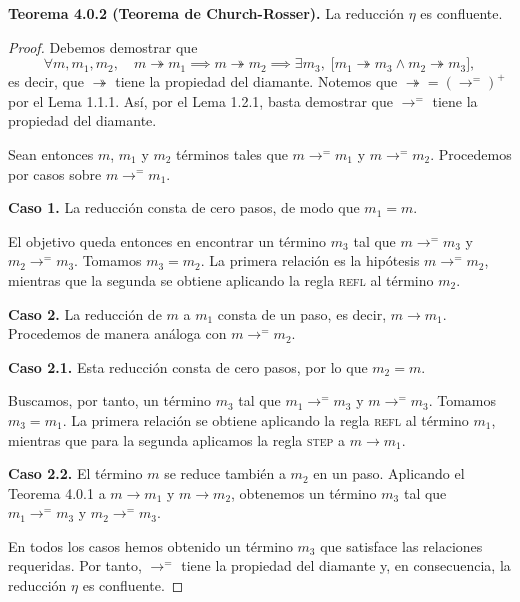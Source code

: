 \documentclass[
  spanish,
  letterpaper,
  DIV=11,
  numbers=noendperiod]{scrreprt}
\theoremstyle{remark}
\begin{document}
\textbf{Teorema 4.0.2 (Teorema de Church-Rosser).} La reducción \(\eta\)
es confluente.

\begin{proof}
Debemos demostrar que \[
\forall m,m_1,m_2,\quad
m\twoheadrightarrow m_1\implies
m\twoheadrightarrow m_2\implies
\exists m_3,\;
\bigl[
m_1\twoheadrightarrow m_3\land
m_2\twoheadrightarrow m_3
\bigr],
\] es decir, que \(\twoheadrightarrow\) tiene la propiedad del diamante.
Notemos que \(\twoheadrightarrow=(\longrightarrow^{=})^+\) por el Lema
1.1.1. Así, por el Lema 1.2.1, basta demostrar que
\(\longrightarrow^{=}\) tiene la propiedad del diamante.

Sean entonces \(m\), \(m_1\) y \(m_2\) términos tales que
\(m\longrightarrow^{=}m_1\) y \(m\longrightarrow^{=}m_2\). Procedemos
por casos sobre \(m\longrightarrow^{=}m_1\).

\textbf{Caso 1.} La reducción consta de cero pasos, de modo que
\(m_1=m\).

El objetivo queda entonces en encontrar un término \(m_3\) tal que
\(m\longrightarrow^{=}m_3\) y \(m_2\longrightarrow^{=}m_3\). Tomamos
\(m_3=m_2\). La primera relación es la hipótesis
\(m\longrightarrow^{=}m_2\), mientras que la segunda se obtiene
aplicando la regla \textsc{refl} al término \(m_2\).

\textbf{Caso 2.} La reducción de \(m\) a \(m_1\) consta de un paso, es
decir, \(m\longrightarrow m_1\). Procedemos de manera análoga con
\(m\longrightarrow^{=}m_2\).

\textbf{Caso 2.1.} Esta reducción consta de cero pasos, por lo que
\(m_2=m\).

Buscamos, por tanto, un término \(m_3\) tal que
\(m_1\longrightarrow^{=}m_3\) y \(m\longrightarrow^{=}m_3\). Tomamos
\(m_3=m_1\). La primera relación se obtiene aplicando la regla
\textsc{refl} al término \(m_1\), mientras que para la segunda aplicamos
la regla \textsc{step} a \(m\longrightarrow m_1\).

\textbf{Caso 2.2.} El término \(m\) se reduce también a \(m_2\) en un
paso. Aplicando el Teorema 4.0.1 a \(m\longrightarrow m_1\) y
\(m\longrightarrow m_2\), obtenemos un término \(m_3\) tal que
\(m_1\longrightarrow^{=}m_3\) y \(m_2\longrightarrow^{=}m_3\).

En todos los casos hemos obtenido un término \(m_3\) que satisface las
relaciones requeridas. Por tanto, \(\longrightarrow^{=}\) tiene la
propiedad del diamante y, en consecuencia, la reducción \(\eta\) es
confluente.
\end{proof}
\end{document}

